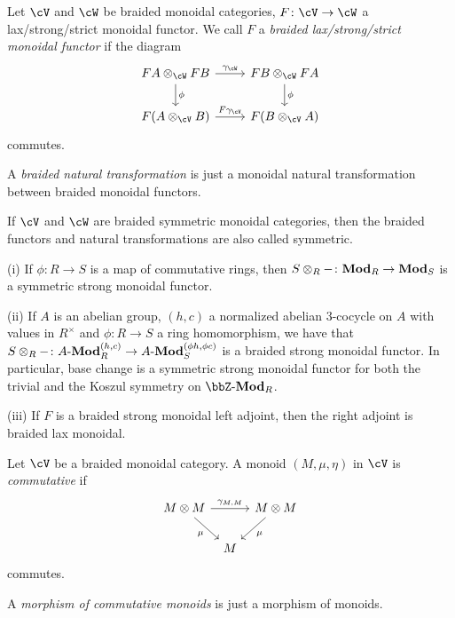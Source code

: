 \documentclass[a4paper,11pt,oneside,openany]{scrbook}
\begin{document}
\begin{defn}
	Let $\cV$ and $\cW$ be braided monoidal categories, $F\colon\cV\rightarrow\cW$ a lax/strong/strict monoidal functor. We call $F$ a \emph{braided lax/strong/strict monoidal functor} if the diagram
	\[
		\begin{tikzcd}
			FA\otimes_\cW FB\ar[r, "\gamma_\cW"]\ar[d, "\phi"]
			& FB\otimes_\cW FA\ar[d, "\phi"] \\
			F(A\otimes_\cV B)\ar[r, "F\gamma_\cV"]
			& F(B\otimes_\cV A)
		\end{tikzcd}
	\]
	commutes.

	A \emph{braided natural transformation} is just a monoidal natural transformation between braided monoidal functors.

	If $\cV$ and $\cW$ are braided symmetric monoidal categories, then the braided functors and natural transformations are also called symmetric.
\end{defn}

\begin{exmp}
	\item[(i)] If $\phi\colon R\rightarrow S$ is a map of commutative rings, then $S\otimes_R-\colon{\normalfont\textbf{Mod}}_R\rightarrow{\normalfont\textbf{Mod}}_S$ is a symmetric strong monoidal functor.

	\item[(ii)] If $A$ is an abelian group, $(h,c)$ a normalized abelian 3-cocycle on $A$ with values in $R^\times$ and $\phi\colon R\rightarrow S$ a ring homomorphism, we have that $S\otimes_R-\colon A\text{-}{\normalfont\textbf{Mod}}_R^{(h,c)}\rightarrow A\text{-}{\normalfont\textbf{Mod}}_S^{(\phi h,\phi c)}$ is a braided strong monoidal functor. In particular, base change is a symmetric strong monoidal functor for both the trivial and the Koszul symmetry on $\bbZ\text{-}\Mod_R$.

	\item[(iii)] If $F$ is a braided strong monoidal left adjoint, then the right adjoint is braided lax monoidal.
\end{exmp}

\begin{defn}
	Let $\cV$ be a braided monoidal category. A monoid $(M,\mu,\eta)$ in $\cV$ is \emph{commutative} if
	\[
		\begin{tikzcd}[column sep=tiny]
			M\otimes M\ar[rr, "\gamma_{M,M}"]\ar[dr, swap, "\mu"]
			&& M\otimes M\ar[dl, "\mu"] \\
			& M
		\end{tikzcd}
	\]
	commutes.

	A \emph{morphism of commutative monoids} is just a morphism of monoids.
\end{defn}
\end{document}
